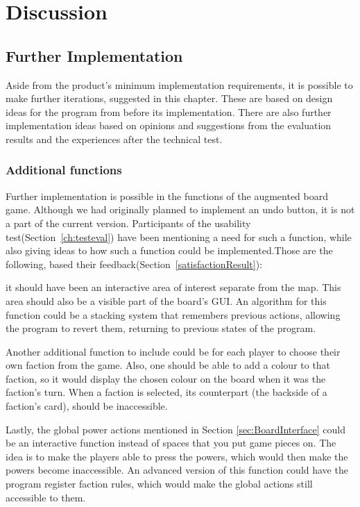 \chapter{Discussion}\label{ch:discussion}


\section{Further Implementation}
Aside from the product's minimum implementation requirements, it is possible to make further iterations, suggested in this chapter. These are based on design ideas for the program from before its implementation. There are also further implementation ideas based on opinions and suggestions from the evaluation results and the experiences after the technical test.

\subsection{Additional functions}
Further implementation is possible in the functions of the augmented board game. Although we had originally planned to implement an undo button, it is not a part of the current version. Participants of the usability test(Section~\ref{ch:testeval}) have been mentioning a need for such a function, while also giving ideas to how such a function could be implemented.Those are the following, based their feedback(Section~\ref{satisfactionResult}):

it should have been an interactive area of interest separate from the map. This area should also be a visible part of the board’s GUI. An algorithm for this function could be a stacking system that remembers previous actions, allowing the program to revert them, returning to previous states of the program.

Another additional function to include could be for each player to choose their own faction from the game. Also, one should be able to add a colour to that faction, so it would display the chosen colour on the board when it was the faction’s turn. When a faction is selected, its counterpart (the backside of a faction’s card), should be inaccessible.

Lastly, the global power actions mentioned in Section \ref{sec:BoardInterface} could be an interactive function instead of spaces that you put game pieces on. The idea is to make the players able to press the powers, which would then make the powers become inaccessible. An advanced version of this function could have the program register faction rules, which would make the global actions still accessible to them. 

